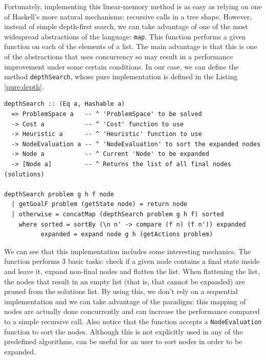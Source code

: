 Fortunately, implementing this linear-memory method is as easy as relying on
one of Haskell's more natural mechanisms: recursive calls in a tree shape.
However, instead of simple depth-first search, we can take advantage of one of
the most widespread abstractions of the language: \texttt{map}. This function
performs a given function on each of the elements of a list. The main advantage
is that this is one of the abstractions that uses concurrency so may result in
a performance improvement under some certain conditions. In our case, we can
define the method \texttt{depthSearch}, whose pure implementation is defined in
the Listing \ref{pure:depth}.\\

\begin{lstlisting}[style=haskell,
caption=Pure \texttt{depthSearch} implementation, label=pure:depth]
depthSearch :: (Eq a, Hashable a)
  => ProblemSpace a   -- ^ 'ProblemSpace' to be solved
  -> Cost a           -- ^ 'Cost' function to use
  -> Heuristic a      -- ^ 'Heuristic' function to use
  -> NodeEvaluation a -- ^ 'NodeEvaluation' to sort the expanded nodes
  -> Node a           -- ^ Current 'Node' to be expanded
  -> [Node a]         -- ^ Returns the list of all final nodes (solutions)
  
depthSearch problem g h f node
  | getGoalF problem (getState node) = return node
  | otherwise = concatMap (depthSearch problem g h f) sorted
    where sorted = sortBy (\n n' -> compare (f n) (f n')) expanded
          expanded = expand node g h (getActions problem)
\end{lstlisting}

We can see that this implementation includes some interesting mechanics. The
function performs 3 basic tasks: check if a given node contains a final state
inside and leave it, expand non-final nodes and flatten the list. When
flattening the list, the nodes that result in an empty list (that is, that
cannot be expanded) are pruned from the solutions list. By using this, we don't
rely on a sequential implementation and we can take advantage of the
paradigm: this mapping of nodes are actually done concurrently and can increase
the performance compared to a simple recursive call. Also notice that the
function accepts a \texttt{NodeEvaluation} function to sort the nodes. Although
this is not explicitly used in any of the predefined algorithms, can be useful
for an user to sort nodes in order to be expanded.\\


